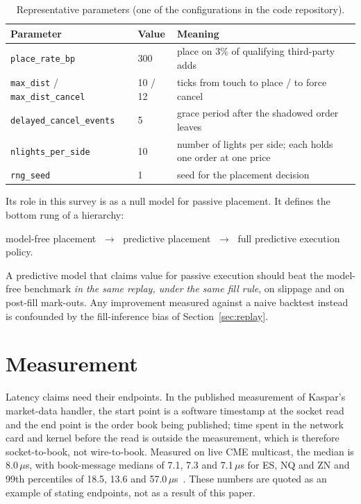 \begin{table}[!htbp]
\centering\small
\caption{Representative \pov{} parameters (one of the configurations in the code repository).}
\label{tab:shadow-params}
\begin{tabular}{lll}
\toprule
Parameter & Value & Meaning \\
\midrule
\texttt{place\_rate\_bp} & 300 & place on 3\% of qualifying third-party adds \\
\texttt{max\_dist} / \texttt{max\_dist\_cancel} & 10 / 12 & ticks from touch to place / to force cancel \\
\texttt{delayed\_cancel\_events} & 5 & grace period after the shadowed order leaves \\
\texttt{nlights\_per\_side} & 10 & number of lights per side; each holds one order at one price \\
\texttt{rng\_seed} & 1 & seed for the placement decision \\
\bottomrule
\end{tabular}
\end{table}

Its role in this survey is as a null model for passive placement. It defines the bottom rung of a
hierarchy:
\begin{center}
model-free placement $\;\to\;$ predictive placement $\;\to\;$ full predictive execution policy.
\end{center}
A predictive model that claims value for passive execution should beat the model-free benchmark
\emph{in the same replay, under the same fill rule}, on slippage and on post-fill mark-outs. Any
improvement measured against a naive backtest instead is confounded by the fill-inference bias
of Section~\ref{sec:replay}.

\section{Measurement}
\label{sec:kaspar-measurement}

Latency claims need their endpoints. In the published measurement of Kaspar's market-data
handler, the start point is a software timestamp at the socket read and the end point is the order
book being published; time spent in the network card and kernel before the read is outside the
measurement, which is therefore socket-to-book, not wire-to-book. Measured on live CME multicast,
the median is 8.0\,$\mu$s, with book-message medians of 7.1, 7.3 and 7.1\,$\mu$s for ES, NQ and ZN
and 99th percentiles of 18.5, 13.6 and 57.0\,$\mu$s~\citep{maciejewski_mdlatency}. These numbers are
quoted as an example of stating endpoints, not as a result of this paper.

